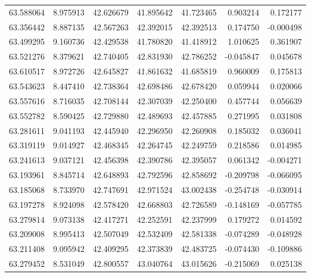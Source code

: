 \begin{tabular}{rrrrrrr}
 63.588064 &   8.975913 &         42.626679 &         41.895642 &         41.723465 &  0.903214 &  0.172177 \\
 63.356442 &   8.887135 &         42.567263 &         42.392015 &         42.392513 &  0.174750 & -0.000498 \\
 63.499295 &   9.160736 &         42.429538 &         41.780820 &         41.418912 &  1.010625 &  0.361907 \\
 63.521276 &   8.379621 &         42.740405 &         42.831930 &         42.786252 & -0.045847 &  0.045678 \\
 63.610517 &   8.972726 &         42.645827 &         41.861632 &         41.685819 &  0.960009 &  0.175813 \\
 63.543623 &   8.447410 &         42.738364 &         42.698486 &         42.678420 &  0.059944 &  0.020066 \\
 63.557616 &   8.716035 &         42.708144 &         42.307039 &         42.250400 &  0.457744 &  0.056639 \\
 63.552782 &   8.590425 &         42.729880 &         42.489693 &         42.457885 &  0.271995 &  0.031808 \\
 63.281611 &   9.041193 &         42.445940 &         42.296950 &         42.260908 &  0.185032 &  0.036041 \\
 63.319119 &   9.014927 &         42.468345 &         42.264745 &         42.249759 &  0.218586 &  0.014985 \\
 63.241613 &   9.037121 &         42.456398 &         42.390786 &         42.395057 &  0.061342 & -0.004271 \\
 63.193961 &   8.845714 &         42.648893 &         42.792596 &         42.858692 & -0.209798 & -0.066095 \\
 63.185068 &   8.733970 &         42.747691 &         42.971524 &         43.002438 & -0.254748 & -0.030914 \\
 63.197278 &   8.924098 &         42.578420 &         42.668803 &         42.726589 & -0.148169 & -0.057785 \\
 63.279814 &   9.073138 &         42.417271 &         42.252591 &         42.237999 &  0.179272 &  0.014592 \\
 63.209008 &   8.995413 &         42.507049 &         42.532409 &         42.581338 & -0.074289 & -0.048928 \\
 63.211408 &   9.095942 &         42.409295 &         42.373839 &         42.483725 & -0.074430 & -0.109886 \\
 63.279452 &   8.531049 &         42.800557 &         43.040764 &         43.015626 & -0.215069 &  0.025138 \\

\end{tabular}
